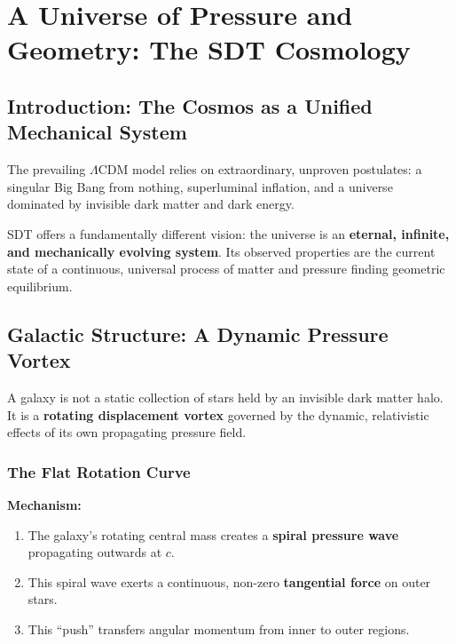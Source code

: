 \chapter{A Universe of Pressure and Geometry: The SDT Cosmology}

\author{James Tyndall}

\section{Introduction: The Cosmos as a Unified Mechanical System}

The prevailing $\Lambda$CDM model relies on extraordinary, unproven postulates: a singular Big Bang from nothing, superluminal inflation, and a universe dominated by invisible dark matter and dark energy.

SDT offers a fundamentally different vision: the universe is an \textbf{eternal, infinite, and mechanically evolving system}.  Its observed properties are the current state of a continuous, universal process of matter and pressure finding geometric equilibrium.


\section{Galactic Structure: A Dynamic Pressure Vortex}

A galaxy is not a static collection of stars held by an invisible dark matter halo.  It is a \textbf{rotating displacement vortex} governed by the dynamic, relativistic effects of its own propagating pressure field.

\subsection{The Flat Rotation Curve}

\textbf{Mechanism:}
\begin{enumerate}
  \item The galaxy's rotating central mass creates a \textbf{spiral pressure wave} propagating outwards at $c$.
  \item This spiral wave exerts a continuous, non-zero \textbf{tangential force} on outer stars.
  \item This ``push'' transfers angular momentum from inner to outer regions.
\end{enumerate}

